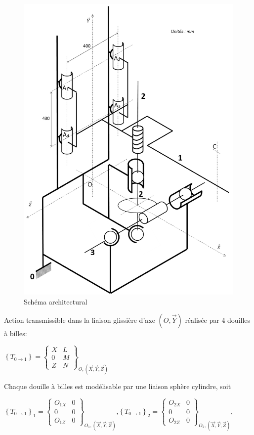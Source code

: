 ~\

\begin{figure}[!h]
\centering
\includegraphics[width=0.55\linewidth]{img/fig10}
\caption{Schéma architectural}
\label{fig10}
\end{figure}

\newpage

Action transmissible dans la liaison glissière d'axe $(O,\overrightarrow{Y})$ réalisée par 4 douilles à billes:
\begin{center}
$\left\{T_{0\rightarrow 1}\right\}=\left\{\begin{array}{cc}X & L \\ 0 & M \\ Z & N\end{array}\right\}_{O,(\overrightarrow{X},\overrightarrow{Y},\overrightarrow{Z})}$
\end{center}

Chaque douille à billes est modélisable par une liaison sphère cylindre, soit
\begin{center}
$\left\{T_{0\rightarrow 1}\right\}_1=\left\{\begin{array}{cc}O_{1X} & 0 \\ 0 & 0 \\ O_{1Z} & 0\end{array}\right\}_{O_1,(\overrightarrow{X},\overrightarrow{Y},\overrightarrow{Z})}$,$\left\{T_{0\rightarrow 1}\right\}_2=\left\{\begin{array}{cc}O_{2X} & 0 \\ 0 & 0 \\ O_{2Z} & 0\end{array}\right\}_{O_2,(\overrightarrow{X},\overrightarrow{Y},\overrightarrow{Z})},$
\end{center}

